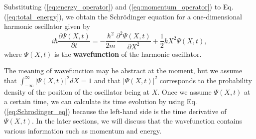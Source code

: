 Substituting (\ref{eq:energy_operator}) and (\ref{eq:momentum_operator}) to Eq. (\ref{eq:total_energy}), we obtain the Schr\"odinger equation for a one-dimensional harmonic oscillator given by
\begin{equation}
  i\hbar\frac{\partial \Psi(X,t)}{\partial t} = -\frac{\hbar^2}{2m}\frac{\partial^2 \Psi(X,t)}{\partial X^2} + \frac 1 2 kX^2\Psi(X,t),
  \label{eq:Schrodinger_eq}
\end{equation}
where $\Psi(X, t)$ is the \textbf{wavefunction} of the harmonic oscillator. 

The meaning of wavefunction may be abstract at the moment, but we assume that $\int_{-\infty}^{\infty}|\Psi(X,t)|^2 dX = 1$ and that $|\Psi(X,t)|^2$ corresponds to the probability density of the position of the oscillator being at $X$. Once we assume $\Psi(X,t)$ at a certain time, we can calculate its time evolution by using Eq. (\ref{eq:Schrodinger_eq}) because the left-hand side is the time derivative of $\Psi(X,t)$. In the later sections, we will discuss that the wavefunction contains various information such as momentum and energy. 

